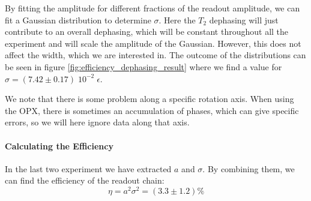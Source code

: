 By fitting the amplitude for different fractions of the readout amplitude, we can fit a Gaussian distribution to determine $\sigma$. Here the $T_2$ dephasing will just contribute to an overall dephasing, which will be constant throughout all the experiment and will scale the amplitude of the Gaussian. However,  this does not affect the width, which we are interested in. The outcome of the distributions can be seen in figure \ref{fig:efficiency_dephasing_result} where we find a value for $\sigma = (7.42 \pm 0.17)\; 10^{-2} \; \epsilon$.

We note that there is some problem along a specific rotation axis. When using the OPX, there is sometimes an accumulation of phases, which can give specific errors, so we will here ignore data along that axis. 

\paragraph{Calculating the Efficiency}
In the last two experiment we have extracted $a$ and $\sigma$. By combining them, we can find the efficiency of the readout chain:
\begin{equation}
    \eta = a^2\sigma^2 = (3.3 \pm 1.2) \% 
\end{equation}





